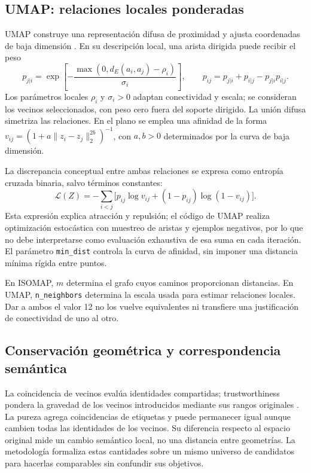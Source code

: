 \subsection{UMAP: relaciones locales ponderadas}
UMAP construye una representación difusa de proximidad y ajusta coordenadas de baja dimensión \parencite{mcinnes2018}. En su descripción local, una arista dirigida puede recibir el peso
\begin{equation}
 p_{j|i}=\exp\!\left[-\frac{\max(0,d_E(a_i,a_j)-\rho_i)}{\sigma_i}\right],
 \qquad p_{ij}=p_{j|i}+p_{i|j}-p_{j|i}p_{i|j}.
\end{equation}
Los parámetros locales $\rho_i$ y $\sigma_i>0$ adaptan conectividad y escala; se consideran los vecinos seleccionados, con peso cero fuera del soporte dirigido. La unión difusa simetriza las relaciones. En el plano se emplea una afinidad de la forma $v_{ij}=(1+a\|z_i-z_j\|_2^{2b})^{-1}$, con $a,b>0$ determinados por la curva de baja dimensión.

La discrepancia conceptual entre ambas relaciones se expresa como entropía cruzada binaria, salvo términos constantes:
\begin{equation}
 \mathcal L(Z)=-\sum_{i<j}\bigl[p_{ij}\log v_{ij}+(1-p_{ij})\log(1-v_{ij})\bigr].
\end{equation}
Esta expresión explica atracción y repulsión; el código de UMAP realiza optimización estocástica con muestreo de aristas y ejemplos negativos, por lo que no debe interpretarse como evaluación exhaustiva de esa suma en cada iteración. El parámetro \texttt{min\_dist} controla la curva de afinidad, sin imponer una distancia mínima rígida entre puntos.

En ISOMAP, $m$ determina el grafo cuyos caminos proporcionan distancias. En UMAP, \texttt{n\_neighbors} determina la escala usada para estimar relaciones locales. Dar a ambos el valor 12 no los vuelve equivalentes ni transfiere una justificación de conectividad de uno al otro.

\subsection{Conservación geométrica y correspondencia semántica}
La coincidencia de vecinos evalúa identidades compartidas; trustworthiness pondera la gravedad de los vecinos introducidos mediante sus rangos originales \parencite{venna2001}. La pureza agrega coincidencias de etiquetas y puede permanecer igual aunque cambien todas las identidades de los vecinos. Su diferencia respecto al espacio original mide un cambio semántico local, no una distancia entre geometrías. La metodología formaliza estas cantidades sobre un mismo universo de candidatos para hacerlas comparables sin confundir sus objetivos.
